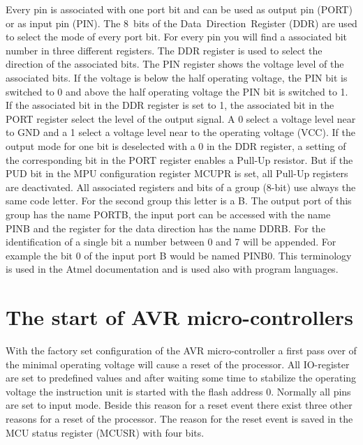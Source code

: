 Every pin is associated with one port bit and can be used as output pin (PORT)
or as input pin (PIN).
The 8~bits of the Data~Direction~Register (DDR) are used to select the mode of every port bit.
For every pin you will find a associated bit number in three different registers.
The DDR register is used to select the direction of the associated bits.
The PIN register shows the voltage level of the associated bits.
If the voltage is below the half operating voltage, the PIN bit is switched to 0 and
above the half operating voltage the PIN bit is switched to 1.
If the associated bit in the DDR register is set to 1,
the associated bit in the PORT register select the level of the output signal.
A 0 select a voltage level near to GND and a 1 select a voltage level near to the
operating voltage (VCC).
If the output mode for one bit is deselected with a 0 in the DDR register, a setting
of the corresponding bit in the PORT register enables a Pull-Up resistor.
But if the PUD bit in the MPU configuration register MCUPR is set,
all Pull-Up registers are deactivated.
All associated registers and bits of a group (8-bit) use always the
same code letter. For the second group this letter is a B.
The output port of this group has the name PORTB, the input port can
be accessed with the name PINB and the register for the data direction
has the name DDRB.
For the identification of a single bit a number between 0 and 7 will be appended.
For example the bit 0 of the input port B would be named PINB0.
This terminology is used in the Atmel documentation and is used also with
program languages.

\section{The start of AVR micro-controllers}

With the factory set configuration of the AVR micro-controller a first
pass over of the minimal operating voltage will cause a reset
of the processor.
All IO-register are set to predefined values and after waiting some
time to stabilize the operating voltage the instruction unit is
started with the flash address 0.
Normally all pins are set to input mode.
Beside this reason for a reset event there exist three other reasons for a reset of
the processor.
The reason for the reset event is saved in the MCU status register (MCUSR) with
four bits.

